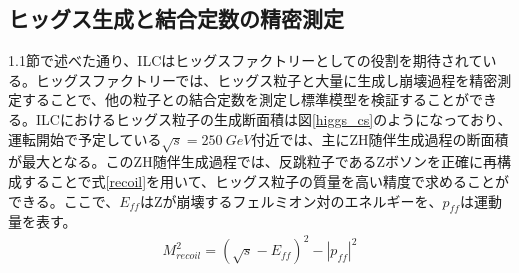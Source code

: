\subsection{ヒッグス生成と結合定数の精密測定}
1.1節で述べた通り、ILCはヒッグスファクトリーとしての役割を期待されている。ヒッグスファクトリーでは、ヒッグス粒子と大量に生成し崩壊過程を精密測定することで、他の粒子との結合定数を測定し標準模型を検証することができる。ILCにおけるヒッグス粒子の生成断面積は図\ref{higgs_cs}のようになっており、運転開始で予定している$\sqrt{s}=250\ GeV$付近では、主にZH随伴生成過程の断面積が最大となる。このZH随伴生成過程では、反跳粒子であるZボソンを正確に再構成することで式\ref{recoil}を用いて、ヒッグス粒子の質量を高い精度で求めることができる。ここで、$E_{ff}$はZが崩壊するフェルミオン対のエネルギーを、$p_{ff}$は運動量を表す。\\
\begin{align}
M_{recoil}^2 = {( \sqrt{s} - E_{ff} )}^2 - {|p_{ff}|}^2
\end{align}
